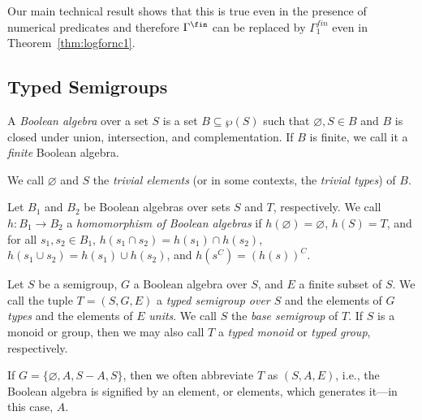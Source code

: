 \documentclass[a4paper,UKenglish,cleveref, autoref, thm-restate, anonymous]{lipics-v2021}
\begin{document}
Our main technical result shows that this is true even in the presence of numerical predicates and therefore $\Gamma^{\fin}$ can be replaced by $\Gamma^{fin}_1$ even in Theorem~\ref{thm:logfornc1}.  



\subsection{Typed Semigroups}\label{sec:backgroundtyped}


\begin{definition}
    A \emph{Boolean algebra} over a set $S$ is a set $B \subseteq \wp(S)$ such that $\varnothing, S \in B$ and $B$ is closed under union, intersection, and complementation. If $B$ is finite, we call it a \emph{finite} Boolean algebra.

    We call $\varnothing$ and $S$ the \emph{trivial elements} (or in some contexts, the \emph{trivial types}) of $B$.
\end{definition}

\begin{definition}
    Let $B_1$ and $B_2$ be Boolean algebras over sets $S$ and $T$, respectively. We call $h : B_1 \rightarrow B_2$ a \emph{homomorphism of Boolean algebras} if $h(\varnothing) = \varnothing$, $h(S) = T$, and for all $s_1, s_2 \in B_1$, $h(s_1 \cap s_2) = h(s_1) \cap h(s_2)$, $h(s_1 \cup s_2) = h(s_1) \cup h(s_2)$, and $h(s^C) = (h(s))^C$.
\end{definition}

\begin{definition}
    Let $S$ be a semigroup, $G$ a Boolean algebra over $S$, and $E$ a finite subset of $S$. We call the tuple $T = (S, G, E)$ a \emph{typed semigroup over $S$} and the elements of $G$ \emph{types} and the elements of $E$ \emph{units}. We call $S$ the \emph{base semigroup} of $T$. If $S$ is a monoid or group, then we may also call $T$ a \emph{typed monoid} or \emph{typed group}, respectively.

    If $G = \{\varnothing, A, S - A, S\}$, then we often abbreviate $T$ as $(S, A, E)$, i.e., the Boolean algebra is signified by an element, or elements, which generates it---in this case, $A$. 
\end{definition}
\end{document}
